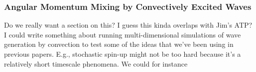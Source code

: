 {\color{purple}
\subsubsection{Angular Momentum Mixing by Convectively Excited Waves}}

Do we really want a section on this?  I guess this kinda overlaps with Jim's ATP?  I could write something about running multi-dimensional simulations of wave generation by convection to test some of the ideas that we've been using in previous papers.  E.g., stochastic spin-up might not be too hard because it's a relatively short timescale phenomena. We could for instance 
